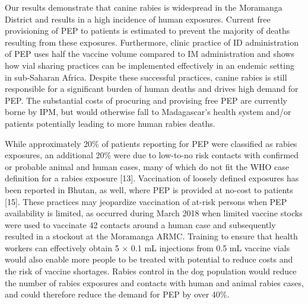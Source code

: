 \documentclass[
]{book}
\begin{document}
Our results demonstrate that canine rabies is widespread in the Moramanga District and results in a high incidence of human exposures. Current free provisioning of PEP to patients is estimated to prevent the majority of deaths resulting from these exposures. Furthermore, clinic practice of ID administration of PEP uses half the vaccine volume compared to IM administration and shows how vial sharing practices can be implemented effectively in an endemic setting in sub-Saharan Africa. Despite these successful practices, canine rabies is still responsible for a significant burden of human deaths and drives high demand for PEP. The substantial costs of procuring and provising free PEP are currently borne by IPM, but would otherwise fall to Madagascar's health system and/or patients potentially leading to more human rabies deaths.

While approximately 20\% of patients reporting for PEP were classified as rabies exposures, an additional 20\% were due to low-to-no risk contacts with confirmed or probable animal and human cases, many of which do not fit the WHO case definition for a rabies exposure {[}13{]}. Vaccination of loosely defined exposures has been reported in Bhutan, as well, where PEP is provided at no-cost to patients {[}15{]}. These practices may jeopardize vaccination of at-risk persons when PEP availability is limited, as occurred during March 2018 when limited vaccine stocks were used to vaccinate 42 contacts around a human case and subsequently resulted in a stockout at the Moramanga ARMC. Training to ensure that health workers can effectively obtain 5 × 0.1 mL injections from 0.5 mL vaccine vials would also enable more people to be treated with potential to reduce costs and the risk of vaccine shortages. Rabies control in the dog population would reduce the number of rabies exposures and contacts with human and animal rabies cases, and could therefore reduce the demand for PEP by over 40\%.
\end{document}
